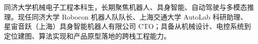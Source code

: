 
\begin{cvparagraph}
同济大学机械电子工程本科生，长期聚焦机器人、具身智能、自动驾驶与多模态推理。现任同济大学 Robocon 机器人队队长、上海交通大学 AutoLab 科研助理、星宙音跃（上海）具身智能机器人有限公司 CTO；具备从机械设计、电控系统到定位建图、算法实现和产品原型落地的跨栈工程能力。
\end{cvparagraph}
